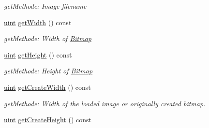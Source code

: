 \begin{DoxyCompactItemize}
\begin{DoxyCompactList}\small\item\em getMethode: Image filename \item\end{DoxyCompactList}\item 
\hypertarget{class_f2_c_1_1_bitmap_a456817554a26f545c06dd371841d9ac7}{
\hyperlink{namespace_f2_c_a58be2bac9eb3e3c99cb41b6008bf4fae}{uint} \hyperlink{class_f2_c_1_1_bitmap_a456817554a26f545c06dd371841d9ac7}{getWidth} () const }
\label{class_f2_c_1_1_bitmap_a456817554a26f545c06dd371841d9ac7}

\begin{DoxyCompactList}\small\item\em getMethode: Width of \hyperlink{class_f2_c_1_1_bitmap}{Bitmap} \item\end{DoxyCompactList}\item 
\hypertarget{class_f2_c_1_1_bitmap_aeb4fad0eefc40bc1ad59a94fa1496353}{
\hyperlink{namespace_f2_c_a58be2bac9eb3e3c99cb41b6008bf4fae}{uint} \hyperlink{class_f2_c_1_1_bitmap_aeb4fad0eefc40bc1ad59a94fa1496353}{getHeight} () const }
\label{class_f2_c_1_1_bitmap_aeb4fad0eefc40bc1ad59a94fa1496353}

\begin{DoxyCompactList}\small\item\em getMethode: Height of \hyperlink{class_f2_c_1_1_bitmap}{Bitmap} \item\end{DoxyCompactList}\item 
\hypertarget{class_f2_c_1_1_bitmap_a7cf28e3c9441ec8d593997eb325b884d}{
\hyperlink{namespace_f2_c_a58be2bac9eb3e3c99cb41b6008bf4fae}{uint} \hyperlink{class_f2_c_1_1_bitmap_a7cf28e3c9441ec8d593997eb325b884d}{getCreateWidth} () const }
\label{class_f2_c_1_1_bitmap_a7cf28e3c9441ec8d593997eb325b884d}

\begin{DoxyCompactList}\small\item\em getMethode: Width of the loaded image or originally created bitmap. \item\end{DoxyCompactList}\item 
\hypertarget{class_f2_c_1_1_bitmap_a05b176d9fe609a4d9678cb1e20ca65e2}{
\hyperlink{namespace_f2_c_a58be2bac9eb3e3c99cb41b6008bf4fae}{uint} \hyperlink{class_f2_c_1_1_bitmap_a05b176d9fe609a4d9678cb1e20ca65e2}{getCreateHeight} () const }
\label{class_f2_c_1_1_bitmap_a05b176d9fe609a4d9678cb1e20ca65e2}


\end{DoxyCompactItemize}
